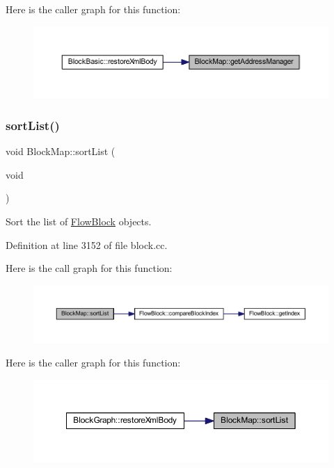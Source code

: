 Here is the caller graph for this function\+:
\nopagebreak
\begin{figure}[H]
\begin{center}
\leavevmode
\includegraphics[width=350pt]{class_block_map_ae320132fd4805cb28efb2c02f7d2e3a7_icgraph}
\end{center}
\end{figure}
\mbox{\label{class_block_map_af56f54d880b34ee2097765f1eb2cbf8e}} 
\subsubsection{\texorpdfstring{sortList()}{sortList()}}
{\footnotesize\ttfamily void Block\+Map\+::sort\+List (\begin{DoxyParamCaption}\item[{void}]{ }\end{DoxyParamCaption})}



Sort the list of \mbox{\hyperlink{class_flow_block}{Flow\+Block}} objects. 



Definition at line 3152 of file block.\+cc.

Here is the call graph for this function\+:
\nopagebreak
\begin{figure}[H]
\begin{center}
\leavevmode
\includegraphics[width=350pt]{class_block_map_af56f54d880b34ee2097765f1eb2cbf8e_cgraph}
\end{center}
\end{figure}
Here is the caller graph for this function\+:
\nopagebreak
\begin{figure}[H]
\begin{center}
\leavevmode
\includegraphics[width=350pt]{class_block_map_af56f54d880b34ee2097765f1eb2cbf8e_icgraph}
\end{center}
\end{figure}


